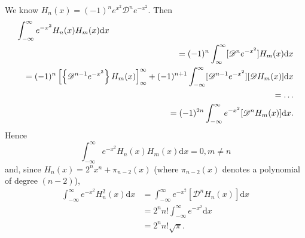 \begin{solution}
We know $H_n(x) = (-1)^n e^{x^2} \mathscr{D}^n e^{-x^2}$.
Then
\begin{eqnarray*}
\lefteqn{\displaystyle\int_{-\infty}^{\infty} e^{-x^2} H_n(x) H_m(x) \mathrm{d}x} \\
& &= (-1)^n \displaystyle\int_{\infty}^{\infty} [\mathscr{D}^n e^{-x^2}] H_m(x) \mathrm{d}x \\
& &= (-1)^n \left[ \left\{ \mathscr{D}^{n-1} e^{-x^2} \right\} H_m(x) \right]_{\infty}^{\infty} + (-1)^{n+1} \displaystyle\int_{-\infty}^{\infty} [\mathscr{D}^{n-1}e^{-x^2}][\mathscr{D}H_m(x)]\mathrm{d}x \\
& &= \ldots \\
& &= (-1)^{2n} \displaystyle\int_{-\infty}^{\infty} e^{-x^2} [\mathscr{D}^n H_m(x)] \mathrm{d}x.
\end{eqnarray*}
Hence
$$\displaystyle\int_{-\infty}^{\infty} e^{-x^2} H_n(x) H_m(x) \mathrm{d}x = 0, m \neq n$$
and, since $H_n(x) = 2^n x^n + \pi_{n-2}(x)$ (where $\pi_{n-2}(x)$ denotes a polynomial of degree $(n-2)$),
$$\begin{array}{ll}
\displaystyle\int_{-\infty}^{\infty} e^{-x^2}H_n^2(x) \mathrm{d}x &= \displaystyle\int_{-\infty}^{\infty} e^{-x^2} [\mathscr{D}^n H_n(x)] \mathrm{d}x \\
&= 2^n n! \displaystyle\int_{-\infty}^{\infty} e^{-x^2} \mathrm{d}x \\
&= 2^n n! \sqrt{\pi}.
\end{array}$$
\end{solution}